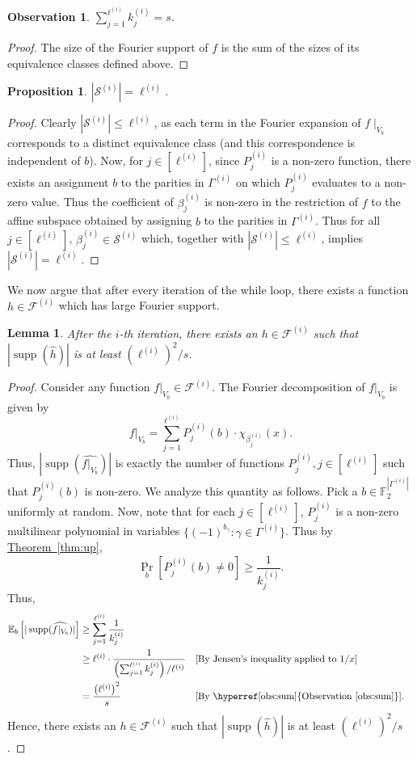 \documentclass[11pt]{article}
\numberwithin{equation}{section}
\newtheorem{lemma}[theorem]{Lemma}
\newtheorem{proposition}[theorem]{Proposition}
\theoremstyle{definition}
\theoremstyle{plain}
\DeclareMathOperator{\Supp}{supp}
\newcommand{\lref}[2][]{\hyperref[#2]{#1~\ref*{#2}}}
\newtheorem{observation}[theorem]{Observation}
\begin{document}
\begin{observation}
\label{obs:sum}
$\displaystyle\sum_{j=1}^{\ell^{(i)}}k_j^{(i)}=s$.
\end{observation}
\begin{proof}
The size of the Fourier support of $f$ is the sum of the sizes of its equivalence classes defined above.
\end{proof}
\begin{proposition}
\label{prop:lbound}
$|\mathcal{S}^{(i)}| = \ell^{(i)}$.
\end{proposition}
\begin{proof}
 Clearly $|\mathcal{S}^{(i)}| \leq \ell^{(i)}$, as each term in the Fourier expansion of $f \mid_{V_b}$ corresponds to a distinct equivalence class (and this correspondence is independent of $b$). Now, for $j\in[\ell^{(i)}]$, since $P_j^{(i)}$ is a non-zero function, there exists an assignment $b$ to the parities in $\Gamma^{(i)}$ on which $P_j^{(i)}$ evaluates to
a non-zero value. Thus the coefficient of $\beta_j^{(i)}$ is non-zero in the restriction of $f$ to the affine subspace obtained by assigning $b$ to the parities in $\Gamma^{(i)}$.
Thus for all $j\in [\ell^{(i)}]$, $\beta_j^{(i)} \in \mathcal{S}^{(i)}$ which, together with $|\mathcal{S}^{(i)}| \leq \ell^{(i)}$, implies $|\mathcal{S}^{(i)}| = \ell^{(i)}$.
\end{proof}
We now argue that after every iteration of the while loop, there
exists a function $h \in \mathcal{F}^{(i)}$ which has large Fourier support.
\begin{lemma}
\label{lem:support}
After the $i$-th iteration, there exists an $h \in \mathcal{F}^{(i)}$ such
that $|\Supp(\widehat{h})|$ is at least $\left({\ell^{(i)}}\right)^2/{s}$.
\end{lemma}
\begin{proof}
Consider any function $f|_{V_b} \in \mathcal{F}^{(i)}$. The Fourier
decomposition of $f|_{V_b}$ is given by
\[
  f|_{V_b} =
  \sum_{j=1}^{\ell^{(i)}}P_j^{(i)}(b)\cdot \chi_{\beta_j^{(i)}}(x).
\]
Thus, $|\Supp(\widehat{f|_{V_b}})|$ is exactly the number of functions
$P_j^{(i)}, j\in [\ell^{(i)}]$ such that $P_j^{(i)}(b)$ is
non-zero. We analyze this quantity as follows. Pick a
$b \in \mathbb{F}_2^{|\Gamma^{(i)}|}$ uniformly at random. Now, note
that for each $j \in [\ell^{(i)}]$, $P_j^{(i)}$ is a non-zero
%
multilinear   %
polynomial
in variables $\{(-1)^{b_\gamma}: \gamma \in \Gamma^{(i)}\}$. Thus by \lref[Theorem]{thm:up},
$$\Pr_b[P_j^{(i)}(b) \neq 0] \geq \frac{1}{k_j^{(i)}}.$$ Thus,
\begin{align*}
\mathbb{E}_b\left[|\Supp(\widehat{f|_{V_b}})|\right] &\geq \sum_{j=1}^{\ell^{(i)}}
\frac{1}{k_j^{(i)}} \\
&\geq \ell^{(i)} \cdot \frac{1}{\left(\sum_{j=1}^{\ell^{(i)}}
    k_j^{(i)}\right)/\ell^{(i)}}  && \text{[By Jensen's inequality applied to $1/x$]}\\
&= \frac{\left(\ell^{(i)}\right)^2}{s} && \text{[By
  \lref[Observation]{obs:sum}]}.
\end{align*}
Hence, there exists an $h \in \mathcal{F}^{(i)}$ such
that $|\Supp(\widehat{h})|$ is at least $\left({\ell^{(i)}}\right)^2/{s}$.
\end{proof}
\end{document}
